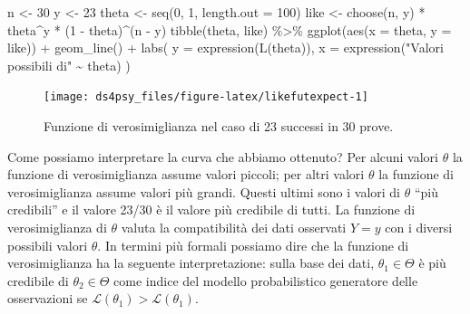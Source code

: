 \documentclass[
  11pt,
]{krantz}
\makeatletter
\newenvironment{Shaded}{\begin{snugshade}}{\end{snugshade}}
\newcommand{\AttributeTok}[1]{\textcolor[rgb]{0.61,0.61,0.61}{#1}}
\newcommand{\DecValTok}[1]{\textcolor[rgb]{0.06,0.06,0.06}{#1}}
\newcommand{\FunctionTok}[1]{\textcolor[rgb]{0,0,0}{#1}}
\newcommand{\NormalTok}[1]{#1}
\newcommand{\OtherTok}[1]{\textcolor[rgb]{0.37,0.37,0.37}{#1}}
\newcommand{\SpecialCharTok}[1]{\textcolor[rgb]{0,0,0}{#1}}
\newcommand{\StringTok}[1]{\textcolor[rgb]{0.5,0.5,0.5}{#1}}
\newenvironment{kframe}{%
\medskip{}
\setlength{\fboxsep}{.8em}
 \def\at@end@of@kframe{}%
 \ifinner\ifhmode%
  \def\at@end@of@kframe{\end{minipage}}%
  \begin{minipage}{\columnwidth}%
 \fi\fi%
 \def\FrameCommand##1{\hskip\@totalleftmargin \hskip-\fboxsep
 \colorbox{shadecolor}{##1}\hskip-\fboxsep
     \hskip-\linewidth \hskip-\@totalleftmargin \hskip\columnwidth}%
 \MakeFramed {\advance\hsize-\width
   \@totalleftmargin\z@ \linewidth\hsize
   \@setminipage}}%
 {\par\unskip\endMakeFramed%
 \at@end@of@kframe}
\renewenvironment{Shaded}{\begin{kframe}}{\end{kframe}}
\theoremstyle{definition}
\theoremstyle{definition}
\theoremstyle{definition}
\theoremstyle{definition}
\theoremstyle{remark}
\makeatother
\begin{document}
\begin{Shaded}
\begin{Highlighting}[]
\NormalTok{n }\OtherTok{\textless{}{-}} \DecValTok{30}
\NormalTok{y }\OtherTok{\textless{}{-}} \DecValTok{23}
\NormalTok{theta }\OtherTok{\textless{}{-}} \FunctionTok{seq}\NormalTok{(}\DecValTok{0}\NormalTok{, }\DecValTok{1}\NormalTok{, }\AttributeTok{length.out =} \DecValTok{100}\NormalTok{)}
\NormalTok{like }\OtherTok{\textless{}{-}} \FunctionTok{choose}\NormalTok{(n, y) }\SpecialCharTok{*}\NormalTok{ theta}\SpecialCharTok{\^{}}\NormalTok{y }\SpecialCharTok{*}\NormalTok{ (}\DecValTok{1} \SpecialCharTok{{-}}\NormalTok{ theta)}\SpecialCharTok{\^{}}\NormalTok{(n }\SpecialCharTok{{-}}\NormalTok{ y)}
\FunctionTok{tibble}\NormalTok{(theta, like) }\SpecialCharTok{\%\textgreater{}\%}
  \FunctionTok{ggplot}\NormalTok{(}\FunctionTok{aes}\NormalTok{(}\AttributeTok{x =}\NormalTok{ theta, }\AttributeTok{y =}\NormalTok{ like)) }\SpecialCharTok{+}
  \FunctionTok{geom\_line}\NormalTok{() }\SpecialCharTok{+}
  \FunctionTok{labs}\NormalTok{(}
    \AttributeTok{y =} \FunctionTok{expression}\NormalTok{(}\FunctionTok{L}\NormalTok{(theta)),}
    \AttributeTok{x =} \FunctionTok{expression}\NormalTok{(}\StringTok{"Valori possibili di"} \SpecialCharTok{\textasciitilde{}}\NormalTok{ theta)}
\NormalTok{  )}
\end{Highlighting}
\end{Shaded}

\begin{figure}[h]

{\centering \texttt{[image: ds4psy\_files/figure-latex/likefutexpect-1]} 

}

\caption{Funzione di verosimiglianza nel caso di 23 successi in 30 prove.}\label{fig:likefutexpect}
\end{figure}

Come possiamo interpretare la curva che abbiamo ottenuto? Per alcuni valori \(\theta\) la funzione di verosimiglianza assume valori piccoli; per altri valori \(\theta\) la funzione di verosimiglianza assume valori più grandi. Questi ultimi sono i valori di \(\theta\) ``più credibili'' e il valore 23/30 è il valore più credibile di tutti. La funzione di verosimiglianza di \(\theta\) valuta la compatibilità dei dati osservati \(Y = y\) con i diversi possibili valori \(\theta\). In termini più formali possiamo dire che la funzione di verosimiglianza ha la seguente interpretazione: sulla base dei dati, \(\theta_1 \in \Theta\) è più credibile di \(\theta_2 \in \Theta\) come indice del modello probabilistico generatore delle osservazioni se \(\mathcal{L}(\theta_1) > \mathcal{L}(\theta_1)\).
\end{document}
